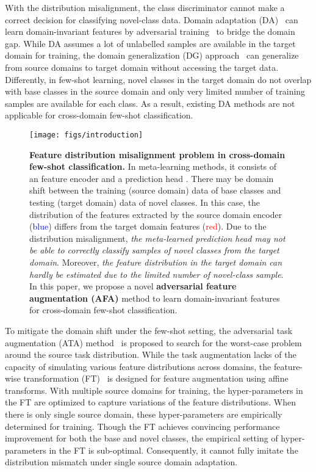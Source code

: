 \documentclass[runningheads]{utils/llncs}
\begin{document}
With the distribution misalignment, the class discriminator  cannot make a correct decision for classifying novel-class data.
Domain adaptation (DA)~\cite{VolpiNSDMS18} can learn domain-invariant features by adversarial training~\cite{GaninUAGLLML17} to bridge the domain gap.
While DA assumes a lot of unlabelled samples are available in the target domain for training, the domain generalization (DG) approach~\cite{LiYZH19} can generalize from source domains to target domain without accessing the target data.
Differently, in few-shot learning, novel classes in the target domain do not overlap with base classes in the source domain and only very limited number of training samples are available for each class.
As a result, existing DA methods are not applicable for cross-domain few-shot classification.
\begin{figure}[t]
\begin{center}
\texttt{[image: figs/introduction]}
\caption{{\bf Feature distribution misalignment problem in cross-domain few-shot classification.} 
In meta-learning methods, it consists of an feature encoder  and a prediction head .
There may be domain shift between the training (source domain) data of base classes and testing (target domain) data of novel classes. 
In this case, the distribution of the features extracted by the source domain encoder (\textcolor{blue}{blue}) differs from the target domain features (\textcolor{red}{red}).
Due to the distribution misalignment, {\textit{the meta-learned prediction head may not be able to correctly classify samples of novel classes from the target domain}}. 
Moreover, \textit{the feature distribution in the target domain can hardly be estimated due to the limited number of novel-class sample}.
In this paper, we propose a novel \textbf{{adversarial feature augmentation (AFA)}} method to learn domain-invariant features for cross-domain few-shot classification.
}
\label{figure0}
\end{center}
\end{figure} 
To mitigate the domain shift under the few-shot setting, the adversarial task augmentation (ATA) method~\cite{WangD21} is proposed to search for the worst-case problem around the source task distribution.
While the task augmentation lacks of the capacity of simulating various feature distributions across domains, the feature-wise transformation (FT)~\cite{TsengLH020} is designed for feature augmentation using affine transforms.
With multiple source domains for training, the hyper-parameters in the FT are optimized to capture variations of the feature distributions.
When there is only single source domain, these hyper-parameters are empirically determined for training.
Though the FT achieves convincing performance improvement for both the base and novel classes, the empirical setting of hyper-parameters in the FT is sub-optimal.
Consequently, it cannot fully imitate the distribution mismatch under single source domain adaptation.
\end{document}
